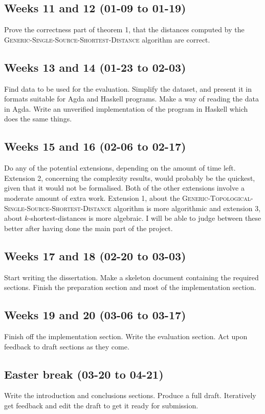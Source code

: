 \subsection*{Weeks 11 and 12 (01-09 to 01-19)}
Prove the correctness part of theorem 1, that the distances computed by the \textsc{Generic-Single-Source-Shortest-Distance} algorithm are correct.

\subsection*{Weeks 13 and 14 (01-23 to 02-03)}
Find data to be used for the evaluation.
Simplify the dataset, and present it in formats suitable for Agda and Haskell programs.
Make a way of reading the data in Agda.
Write an unverified implementation of the program in Haskell which does the same things.

\subsection*{Weeks 15 and 16 (02-06 to 02-17)}
Do any of the potential extensions, depending on the amount of time left.
Extension 2, concerning the complexity results, would probably be the quickest, given that it would not be formalised.
Both of the other extensions involve a moderate amount of extra work.
Extension 1, about the \textsc{Generic-Topological-Single-Source-Shortest-Distance} algorithm is more algorithmic and extension 3, about $k$-shortest-distances is more algebraic.
I will be able to judge between these better after having done the main part of the project.

\subsection*{Weeks 17 and 18 (02-20 to 03-03)}
Start writing the dissertation.
Make a skeleton document containing the required sections.
Finish the preparation section and most of the implementation section.

\subsection*{Weeks 19 and 20 (03-06 to 03-17)}
Finish off the implementation section.
Write the evaluation section.
Act upon feedback to draft sections as they come.

\subsection*{Easter break (03-20 to 04-21)}
Write the introduction and conclusions sections.
Produce a full draft.
Iteratively get feedback and edit the draft to get it ready for submission.
